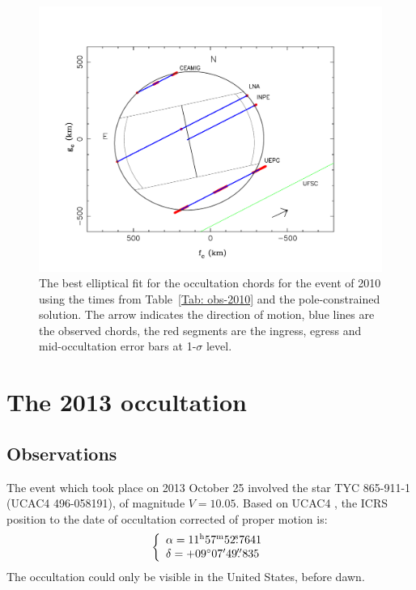 \documentclass[useAMS,usenatbib]{mn2e}
\begin{document}
\begin{figure}
\includegraphics[scale=0.36]{figures/Ceres_2010_sphere.pdf} 
\caption{The best elliptical fit for the occultation chords for the event of 2010 using the times from Table~\ref{Tab: obs-2010} and the pole-constrained solution. The arrow indicates the direction of motion, blue lines are the observed chords, the red segments are the ingress, egress and mid-occultation error bars at 1-$\sigma$ level. \label{Fig:Ceres-2010-body}}
\end{figure}







\section{The 2013 occultation}

\subsection{Observations}\label{Sec: observation-2013}

The event which took place on 2013 October 25 involved the star TYC 865-911-1 (UCAC4 496-058191), of magnitude $V = 10.05$. Based on UCAC4 \citep{Zacharias2013}, the ICRS position to the date of occultation corrected of proper motion is:
%
\begin{equation}
\left\{ 
  \begin{array}{l l}
    \alpha = 11^{\rmn{h}}57^{\rmn{m}}52\fs7641\\
    \delta = +09\degr 07\arcmin 49\farcs835
  \end{array}
\right.
\end{equation}
%
The occultation could only be visible in the United States, before dawn.%
\end{document}
